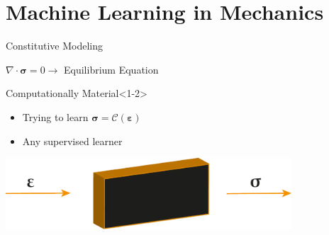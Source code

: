 \section{Machine Learning in Mechanics}

\begin{frame}{Constitutive Modeling}
\begin{center}
  $\nabla \cdot \boldsymbol{\sigma} =0 \to  $ Equilibrium Equation 
\end{center}
  
\begin{minipage}{0.45\textwidth}
  \begin{block}{\color{White} Computationally Material}<1-2>
    \begin{itemize}
      \item <1> Trying to learn $\boldsymbol{\sigma}=\mathcal{C}(\boldsymbol{\varepsilon})$ 
      \item <2> Any supervised learner
    \end{itemize}
  \end{block} 
\end{minipage}%
\hspace{1cm}
\begin{minipage}{0.45\textwidth}
  \centering
  \includegraphics[width=0.8\textwidth]{Figures/surrogate/material.pdf}
\end{minipage}
\end{frame}

